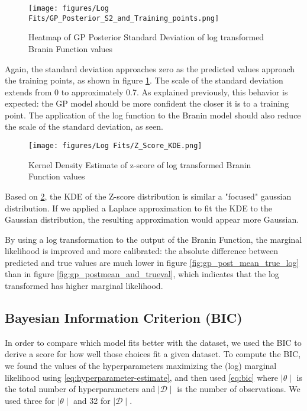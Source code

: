 \documentclass[11pt]{article}
\newcommand{\mc}[1]{\mathcal{#1}}
\newcommand{\data}{\mc{D}}
\numberwithin{equation}{section}
\begin{document}
\begin{figure}[H]
  \centering
  \texttt{[image: figures/Log Fits/GP\_Posterior\_S2\_and\_Training\_points.png]}
  \caption{Heatmap of GP Posterior Standard Deviation of log transformed Branin Function values}
  \label{fig:gp_post_std_log}
\end{figure}
Again, the standard deviation approaches zero as the predicted values approach the training points, as shown in figure \ref{fig:gp_post_std_log}. The scale of the standard deviation extends from 0 to approximately 0.7. As explained previously, this behavior is expected: the GP model should be more confident the closer it is to a training point. The application of the log function to the Branin model should also reduce the scale of the standard deviation, as seen. 

\begin{figure}[H]
  \centering
  \texttt{[image: figures/Log Fits/Z\_Score\_KDE.png]}
  \caption{Kernel Density Estimate of z-score of log transformed Branin Function values}
  \label{fig:zscore_kde_log}
\end{figure}
Based on \ref{fig:zscore_kde_log}, the KDE of the Z-score distribution is similar a "focused" gaussian distribution. If we applied a Laplace approximation to fit the KDE to the Gaussian distribution, the resulting approximation would appear more Gaussian.

By using a log transformation to the output of the Branin Function, the marginal likelihood is improved and more calibrated: the absolute difference between predicted and true values are much lower in figure \ref{fig:gp_post_mean_true_log} than in figure \ref{fig:gp_postmean_and_trueval}, which indicates that the log transformed has higher marginal likelihood.

\subsection*{Bayesian Information Criterion (BIC)}
In order to compare which model fits better with the dataset, we used the BIC to derive a score for how well those choices fit a given dataset. To compute the BIC, we found the values of the hyperparameters maximizing the (log) marginal likelihood using \ref{eq:hyperparameter-estimate}, and then used \ref{eq:bic} where $\mid \theta \mid$ is the total number of hyperparameters and $\mid \data \mid$ is the number of observations. We used three for $\mid \theta \mid$ and 32 for $\mid \data \mid$. 
\end{document}
